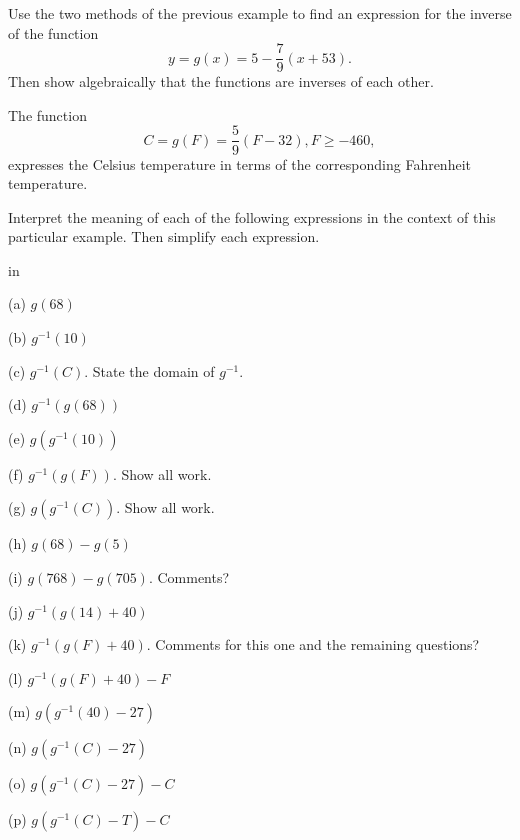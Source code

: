 \documentclass{ximera}
\newcommand{\pskip}{\vskip 0.1 in}
\begin{document}
\begin{question}  \label{Qre345rrree}
Use the two methods of the previous example to find an expression for the inverse of the function 
\[
      y =  g(x) = 5 - \frac{7}{9} \left( x + 53 \right) . 
\] 
Then show algebraically that the functions are inverses of each other.
\end{question}


\begin{example} \label{Ex1:Inverses}
The function
\[
    C = g(F) = \frac{5}{9}\left( F - 32  \right) , F\geq -460 ,
\]
expresses the Celsius temperature in terms of the corresponding Fahrenheit temperature.

Interpret the meaning of each of the following expressions in the context of this particular example. Then simplify each expression.

\pskip

(a) $g(68)$

(b) $g^{-1}(10)$

(c) $g^{-1}(C)$. State the domain of $g^{-1}$.

(d)  $g^{-1}(g(68))$

(e) $g(g^{-1}(10))$

(f) $g^{-1}(g(F))$. Show all work.

(g) $g(g^{-1}(C))$. Show all work.

(h) $g(68) - g(5)$

(i) $g(768) - g(705)$. Comments?

(j) $g^{-1}(g(14)+40)$

(k) $g^{-1}(g(F)+40)$. Comments for this one and the remaining questions?

(l) $g^{-1}(g(F)+40) - F$

(m) $g(g^{-1}(40) - 27)$

(n) $g(g^{-1}(C) - 27)$

(o) $g(g^{-1}(C) - 27) - C$

(p) $g(g^{-1}(C) - T) - C$

\end{example}
\end{document}
